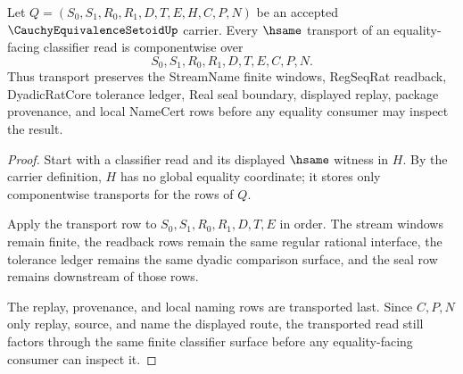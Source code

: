 \begin{theorem}
\label{thm:cauchy-equivalence-setoid-transport}
Let $Q=(S_0,S_1,R_0,R_1,D,T,E,H,C,P,N)$ be an accepted $\CauchyEquivalenceSetoidUp$ carrier. Every $\hsame$ transport of an equality-facing classifier read is componentwise over
$$
S_0,S_1,R_0,R_1,D,T,E,C,P,N .
$$
Thus transport preserves the StreamName finite windows, RegSeqRat readback, DyadicRatCore tolerance ledger, Real seal boundary, displayed replay, package provenance, and local NameCert rows before any equality consumer may inspect the result.
\end{theorem}
\begin{proof}
Start with a classifier read and its displayed $\hsame$ witness in $H$. By the carrier definition, $H$ has no global equality coordinate; it stores only componentwise transports for the rows of $Q$.

Apply the transport row to $S_0,S_1,R_0,R_1,D,T,E$ in order. The stream windows remain finite, the readback rows remain the same regular rational interface, the tolerance ledger remains the same dyadic comparison surface, and the seal row remains downstream of those rows.

The replay, provenance, and local naming rows are transported last. Since $C,P,N$ only replay, source, and name the displayed route, the transported read still factors through the same finite classifier surface before any equality-facing consumer can inspect it.
\end{proof}

